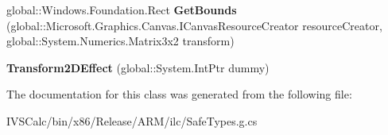 \begin{DoxyCompactItemize}
\item 
\mbox{\label{class_microsoft_1_1_graphics_1_1_canvas_1_1_effects_1_1_transform2_d_effect_ac6842a4b23389a0cf09a892e0a70cdd6}} 
global\+::\+Windows.\+Foundation.\+Rect {\bfseries Get\+Bounds} (global\+::\+Microsoft.\+Graphics.\+Canvas.\+I\+Canvas\+Resource\+Creator resource\+Creator, global\+::\+System.\+Numerics.\+Matrix3x2 transform)
\item 
\mbox{\label{class_microsoft_1_1_graphics_1_1_canvas_1_1_effects_1_1_transform2_d_effect_a3748c768254be919302047eede7038cd}} 
{\bfseries Transform2\+D\+Effect} (global\+::\+System.\+Int\+Ptr dummy)
\end{DoxyCompactItemize}


The documentation for this class was generated from the following file\+:\begin{DoxyCompactItemize}
\item 
I\+V\+S\+Calc/bin/x86/\+Release/\+A\+R\+M/ilc/Safe\+Types.\+g.\+cs\end{DoxyCompactItemize}

